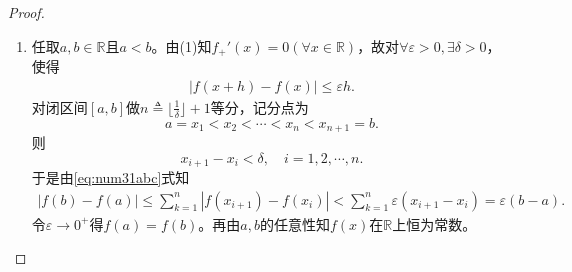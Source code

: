 \documentclass[../../main.tex]{subfiles}%
\begin{document}
\begin{proof}
\begin{enumerate}[(1)]
\item 任取$a,b\in \mathbb{R}$且$a<b$。由(1)知$f_{+}'\left(x\right)=0\left( \forall x\in \mathbb{R} \right)$，故对$\forall \varepsilon>0,\exists \delta>0$，使得
\begin{align}\label{eq:num31abc}
\left| f\left(x+h\right)-f\left(x\right) \right|\leqslant \varepsilon h.
\end{align}
对闭区间$\left[a,b\right]$做$n\triangleq \lfloor \frac{1}{\delta} \rfloor +1$等分，记分点为
\[a=x_1<x_2<\cdots <x_n<x_{n+1}=b.\]
则
\[x_{i+1}-x_i<\delta ,\quad i=1,2,\cdots ,n.\]
于是由\eqref{eq:num31abc}式知
\begin{align*}
\left| f\left(b\right)-f\left(a\right) \right|\leqslant \sum\limits_{k=1}^n\left| f\left(x_{i+1}\right)-f\left(x_i\right) \right|<\sum\limits_{k=1}^n\varepsilon \left(x_{i+1}-x_i\right)=\varepsilon \left(b-a\right).
\end{align*}
令$\varepsilon \to 0^+$得$f\left(a\right)=f\left(b\right)$。再由$a,b$的任意性知$f\left(x\right)$在$\mathbb{R}$上恒为常数。
\end{enumerate}
\end{proof}
\end{document}
